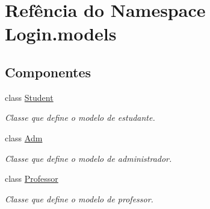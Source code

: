 \hypertarget{namespaceLogin_1_1models}{\section{Refência do Namespace Login.\-models}
\label{d5/db1/namespaceLogin_1_1models}
}
\subsection*{Componentes}
\begin{DoxyCompactItemize}
\item 
class \hyperlink{classLogin_1_1models_1_1Student}{Student}
\begin{DoxyCompactList}\small\item\em Classe que define o modelo de estudante. \end{DoxyCompactList}\item 
class \hyperlink{classLogin_1_1models_1_1Adm}{Adm}
\begin{DoxyCompactList}\small\item\em Classe que define o modelo de administrador. \end{DoxyCompactList}\item 
class \hyperlink{classLogin_1_1models_1_1Professor}{Professor}
\begin{DoxyCompactList}\small\item\em Classe que define o modelo de professor. \end{DoxyCompactList}\end{DoxyCompactItemize}
